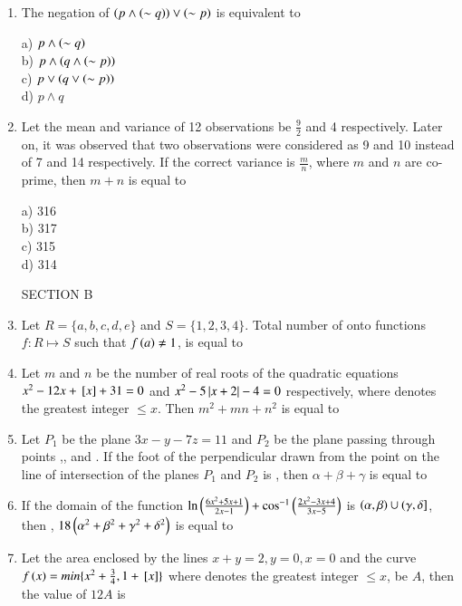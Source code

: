 \documentclass[journal]{IEEEtran}
\begin{document}
\begin{enumerate}
\item The negation of $\left(p \land \left(\sim q\right)\right) \lor \left(\sim p\right)
$ is equivalent to
\begin{multicols}{4}
    a) $p \land \left(\sim q\right)$\\
    b) $p \land \left(q \land \left(\sim p\right)\right)$\\
    c)  $p \lor \left(q \lor \left(\sim p\right)\right)$\\
    d) $p\land q$
\end{multicols}

\item Let the mean and variance of 12 observations be $\frac{9}{2}$ and 4 respectively. Later on, it was observed that two observations were considered as 9 and 10 instead of 7 and 14 respectively. If the correct variance is $\frac{m}{n}$, where $m$ and $n$ are co-prime, then $m+n$ is equal to
\begin{multicols}{4}
    a) 316\\
    b) 317\\
    c) 315\\
    d) 314
\end{multicols}
SECTION B
\item Let $R=\{a,b,c,d,e\}$ and $S=\{1,2,3,4\}$. Total number of onto functions $f: R\mapsto S$ such that $f\left(a\right)\neq 1$, is equal to 

\item Let $m$ and $n$ be the number of real roots of the quadratic equations $x^2-12x+{}\left[x\right]+31=0$ and $x^2-5\left\vert x+2\right\vert-4=0$ respectively, where  denotes the greatest integer $\leq x$. Then $m^2+mn+n^2$ is equal to

\item Let $P_1$ be the plane $3x-y-7z=11$ and $P_2$ be the plane passing through points ,, and . If the foot of the perpendicular drawn from the point  on the line of intersection of the planes $P_1$ and $P_2$ is \brak{\alpha,\beta,\gamma}, then $\alpha+\beta+\gamma$ is equal to

\item If the domain of the function $\ln \left(\frac{6x^2+5x+1}{2x-1}\right)+\cos^{-1}\left(\frac{2x^2-3x+4}{3x-5}\right)$ is $\left(\alpha,\beta\right)\cup(\gamma,\delta]$, then , $18\left(\alpha^2+\beta^2+\gamma^2+\delta^2\right)$ is equal to

\item Let the area enclosed by the lines $x+y=2, y=0, x=0$ and the curve $f\left(x\right)=min\{x^2+\frac{3}{4},1+{}\left[x\right]\}$ where  denotes the greatest integer $\leq x$, be $A$, then the value of $12A$ is


\end{enumerate}
\end{document}
